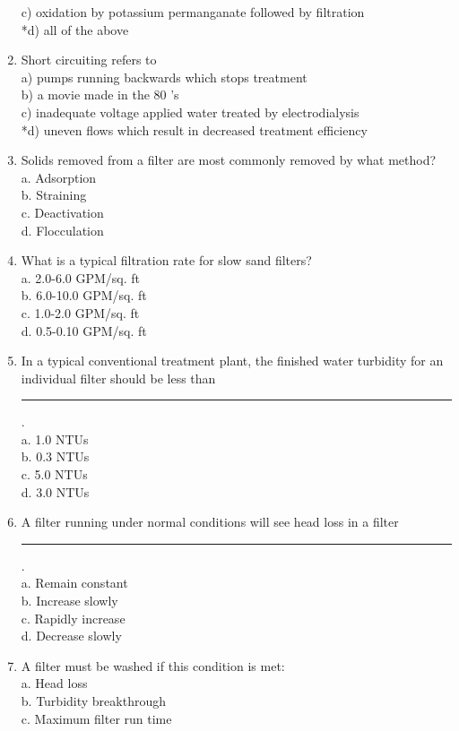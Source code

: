 \begin{enumerate}
c) oxidation by potassium permanganate followed by filtration\\
*d) all of the above
\item Short circuiting refers to\\
a) pumps running backwards which stops treatment\\
b) a movie made in the 80 's\\
c) inadequate voltage applied water treated by electrodialysis\\
*d) uneven flows which result in decreased treatment efficiency\\
\item Solids removed from a filter are most commonly removed by what method?\\
a.	Adsorption\\
b.	Straining\\
c.	Deactivation\\
d.	Flocculation\\
\item What is a typical filtration rate for slow sand filters?\\
a.	2.0-6.0 GPM/sq. ft\\
b.	6.0-10.0 GPM/sq. ft\\
c.	1.0-2.0 GPM/sq. ft\\
d.	0.5-0.10 GPM/sq. ft\\
\item In a typical conventional treatment plant, the finished water turbidity for an individual filter should be less than \rule{1.5cm}{0.5pt}.\\
a.	1.0 NTUs\\
b.	0.3 NTUs\\
c.	5.0 NTUs\\
d.	3.0 NTUs\\
\item A filter running under normal conditions will see head loss in a filter \rule{1.5cm}{0.5pt}.\\
a.	Remain constant\\
b.	Increase slowly\\
c.	Rapidly increase\\
d.	Decrease slowly\\
\item A filter must be washed if this condition is met:\\
a.	Head loss\\
b.	Turbidity breakthrough\\
c.	Maximum filter run time\\

\end{enumerate}
